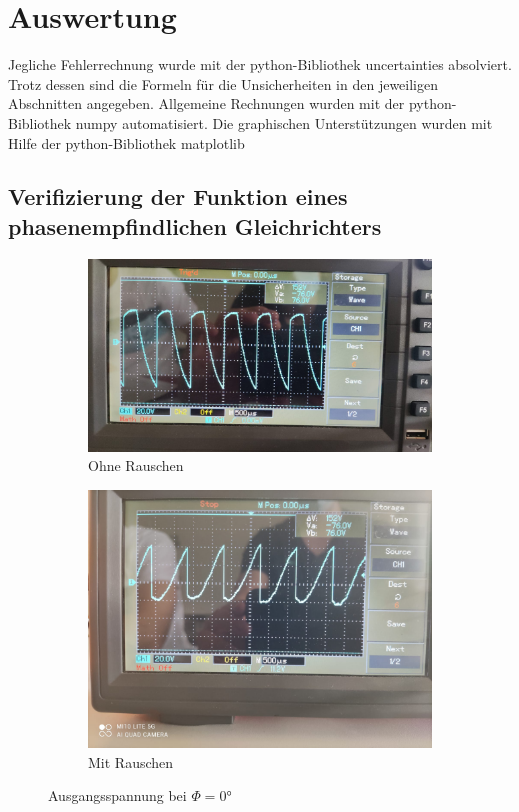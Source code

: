 \section{Auswertung}
\label{sec:Auswertung}Jegliche Fehlerrechnung wurde mit der python-Bibliothek uncertainties \cite{uncertainties} absolviert.
Trotz dessen sind die Formeln für die Unsicherheiten in den jeweiligen Abschnitten angegeben.
Allgemeine Rechnungen wurden mit der python-Bibliothek numpy \cite{numpy} automatisiert.  
Die graphischen Unterstützungen wurden mit Hilfe der python-Bibliothek matplotlib \cite{matplotlib}
\subsection{Verifizierung der Funktion eines phasenempfindlichen Gleichrichters}
\begin{figure}
    \begin{subfigure}{0.48 \textwidth}
        \centering
        \includegraphics{data_scripts/pics/0o.jpeg}
        \caption{Ohne Rauschen}
    \end{subfigure}
    \hfill
    \begin{subfigure}{0.48 \textwidth}
            \centering
            \includegraphics{data_scripts/pics/0m.jpeg}
            \caption{Mit Rauschen}
    \end{subfigure}
    \caption{Ausgangsspannung bei $\Phi = \ang{0;;}$}
\end{figure}
